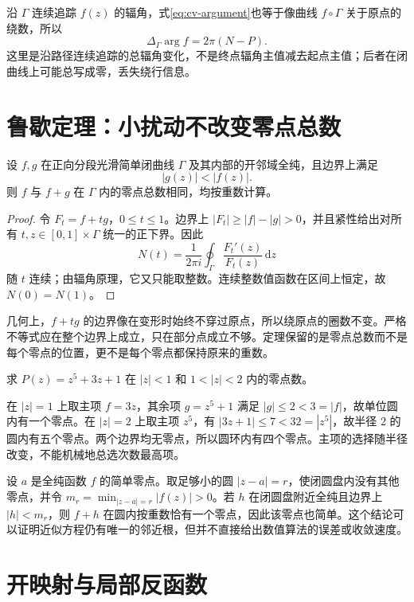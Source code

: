 \documentclass[UTF8,12pt,a4paper,fontset=fandol]{ctexbook}
\begin{document}
沿 $\Gamma$ 连续追踪 $f(z)$ 的辐角，式\eqref{eq:cv-argument}也等于像曲线 $f\circ\Gamma$ 关于原点的绕数，所以
\[
 \Delta_\Gamma\arg f=2\pi(N-P).
\]
这里是沿路径连续追踪的总辐角变化，不是终点辐角主值减去起点主值；后者在闭曲线上可能总写成零，丢失绕行信息。

\section{鲁歇定理：小扰动不改变零点总数}

\begin{theorem}[鲁歇定理]
\label{thm:cv-rouche}
设 $f,g$ 在正向分段光滑简单闭曲线 $\Gamma$ 及其内部的开邻域全纯，且边界上满足
\[
 |g(z)|<|f(z)|.
\]
则 $f$ 与 $f+g$ 在 $\Gamma$ 内的零点总数相同，均按重数计算。
\end{theorem}
\begin{proof}
令 $F_t=f+tg$，$0\le t\le1$。边界上 $|F_t|\ge|f|-|g|>0$，并且紧性给出对所有 $t,z\in[0,1]\times\Gamma$ 统一的正下界。因此
\[
 N(t)=\frac1{2\pi i}\oint_\Gamma\frac{F_t'(z)}{F_t(z)}\,\mathrm dz
\]
随 $t$ 连续；由辐角原理，它又只能取整数。连续整数值函数在区间上恒定，故 $N(0)=N(1)$。
\end{proof}

几何上，$f+tg$ 的边界像在变形时始终不穿过原点，所以绕原点的圈数不变。严格不等式应在整个边界上成立，只在部分点成立不够。定理保留的是零点总数而不是每个零点的位置，更不是每个零点都保持原来的重数。

\begin{example}[不用求根公式判断根的位置]
求 $P(z)=z^5+3z+1$ 在 $|z|<1$ 和 $1<|z|<2$ 内的零点数。
\end{example}
\begin{solve}
在 $|z|=1$ 上取主项 $f=3z$，其余项 $g=z^5+1$ 满足 $|g|\le2<3=|f|$，故单位圆内有一个零点。在 $|z|=2$ 上取主项 $z^5$，有 $|3z+1|\le7<32=|z^5|$，故半径 $2$ 的圆内有五个零点。两个边界均无零点，所以圆环内有四个零点。主项的选择随半径改变，不能机械地总选次数最高项。
\end{solve}

\begin{example}[简单根在小扰动下的稳定性]
设 $a$ 是全纯函数 $f$ 的简单零点。取足够小的圆 $|z-a|=r$，使闭圆盘内没有其他零点，并令 $m_r=\min_{|z-a|=r}|f(z)|>0$。若 $h$ 在闭圆盘附近全纯且边界上 $|h|<m_r$，则 $f+h$ 在圆内按重数恰有一个零点，因此该零点也简单。这个结论可以证明近似方程仍有唯一的邻近根，但并不直接给出数值算法的误差或收敛速度。
\end{example}

\section{开映射与局部反函数}
\end{document}
